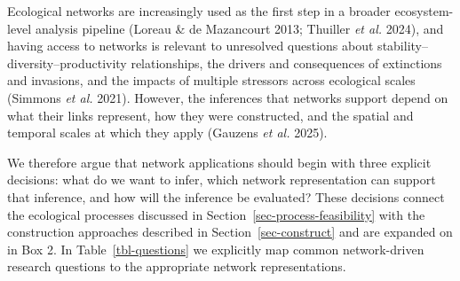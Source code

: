 \documentclass[
]{article}
\begin{document}
Ecological networks are increasingly used as the first step in a broader
ecosystem-level analysis pipeline (Loreau \& de Mazancourt 2013;
Thuiller \emph{et al.} 2024), and having access to networks is relevant
to unresolved questions about stability--diversity--productivity
relationships, the drivers and consequences of extinctions and
invasions, and the impacts of multiple stressors across ecological
scales (Simmons \emph{et al.} 2021). However, the inferences that
networks support depend on what their links represent, how they were
constructed, and the spatial and temporal scales at which they apply
(Gauzens \emph{et al.} 2025).

We therefore argue that network applications should begin with three
explicit decisions: what do we want to infer, which network
representation can support that inference, and how will the inference be
evaluated? These decisions connect the ecological processes discussed in
Section~\ref{sec-process-feasibility} with the construction approaches
described in Section~\ref{sec-construct} and are expanded on in Box 2.
In Table~\ref{tbl-questions} we explicitly map common network-driven
research questions to the appropriate network representations.
\end{document}
